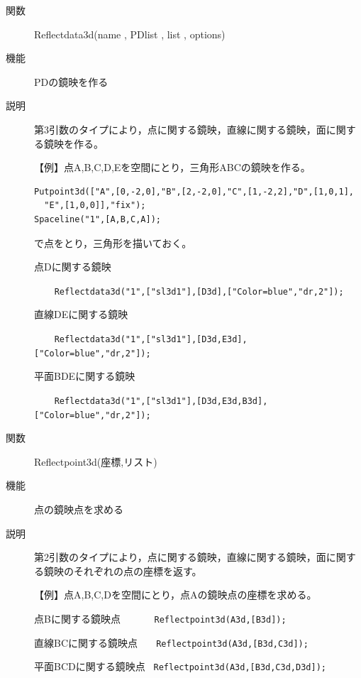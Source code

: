 \documentclass[papersize,a4paper,12pt,uplatex]{jsarticle}
\begin{document}
\begin{description}
\hypertarget{reflectdata3d}{}
\item[関数]  Reflectdata3d(name , PDlist , list , options)
\item[機能]  PDの鏡映を作る
\item[説明]  第3引数のタイプにより，点に関する鏡映，直線に関する鏡映，面に関する鏡映を作る。

\vspace{\baselineskip}
【例】点A,B,C,D,Eを空間にとり，三角形ABCの鏡映を作る。

\begin{verbatim}
Putpoint3d(["A",[0,-2,0],"B",[2,-2,0],"C",[1,-2,2],"D",[1,0,1],
  "E",[1,0,0]],"fix");
Spaceline("1",[A,B,C,A]);
\end{verbatim}

で点をとり，三角形を描いておく。

点Dに関する鏡映

 \verb|    Reflectdata3d("1",["sl3d1"],[D3d],["Color=blue","dr,2"]);|

\hspace{20mm} 

直線DEに関する鏡映 

 \verb|    Reflectdata3d("1",["sl3d1"],[D3d,E3d],["Color=blue","dr,2"]);|

\hspace{20mm} 

平面BDEに関する鏡映

\verb|    Reflectdata3d("1",["sl3d1"],[D3d,E3d,B3d],["Color=blue","dr,2"]);|

\hspace{20mm} 
 

\vspace{\baselineskip}
\hypertarget{reflectpoint3d}{}
\item[関数]  Reflectpoint3d(座標,リスト)
\item[機能]  点の鏡映点を求める
\item[説明]  第2引数のタイプにより，点に関する鏡映，直線に関する鏡映，面に関する鏡映のそれぞれの点の座標を返す。

\vspace{\baselineskip}
【例】点A,B,C,Dを空間にとり，点Aの鏡映点の座標を求める。

点Bに関する鏡映点      \verb|      Reflectpoint3d(A3d,[B3d]);|
    
直線BCに関する鏡映点  \verb|   Reflectpoint3d(A3d,[B3d,C3d]);|
    
平面BCDに関する鏡映点  \verb| Reflectpoint3d(A3d,[B3d,C3d,D3d]);|
 

\end{description}
\end{document}
